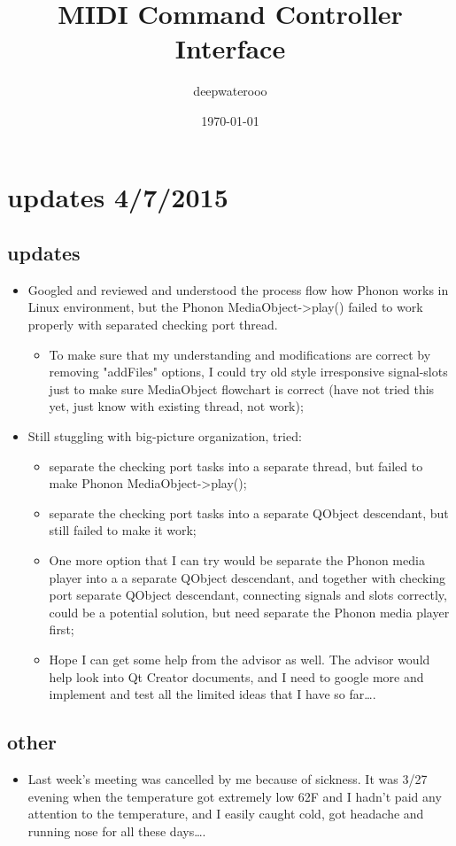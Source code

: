\documentclass[9pt,b5paper]{article}
\author{deepwaterooo}
\date{\today}
\title{MIDI Command Controller Interface}
\begin{document}
\maketitle
\tableofcontents


\section{updates 4/7/2015}
\label{sec-1}
\subsection{updates}
\label{sec-1-1}
\begin{itemize}
\item Googled and reviewed and understood the process flow how Phonon works in Linux environment, but the Phonon MediaObject->play() failed to work properly with separated checking port thread. 
\begin{itemize}
\item To make sure that my understanding and modifications are correct by removing "addFiles" options, I could try old style irresponsive signal-slots just to make sure MediaObject flowchart is correct (have not tried this yet, just know with existing thread, not work);
\end{itemize}
\item Still stuggling with big-picture organization, tried: 
\begin{itemize}
\item separate the checking port tasks into a separate thread, but failed to make Phonon MediaObject->play();
\item separate the checking port tasks into a separate QObject descendant, but still failed to make it work;
\item One more option that I can try would be separate the Phonon media player into a a separate QObject descendant, and together with checking port separate QObject descendant, connecting signals and slots correctly, could be a potential solution, but need separate the Phonon media player first;
\item Hope I can get some help from the advisor as well. The advisor would help look into Qt Creator documents, and I need to google more and implement and test all the limited ideas that I have so far\ldots{}.
\end{itemize}
\end{itemize}
\subsection{other}
\label{sec-1-2}
\begin{itemize}
\item Last week's meeting was cancelled by me because of sickness. It was 3/27 evening when the temperature got extremely low 62F and I hadn't paid any attention to the temperature, and I easily caught cold, got headache and running nose for all these days\ldots{}.
\end{itemize}
\end{document}
